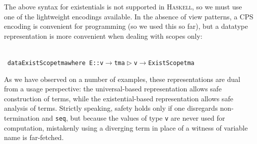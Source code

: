 \documentclass[9pt,authoryear]{sigplanconf}
\begin{document}
%
%


%
The above syntax for existentials is not supported in \textsc{Haskell},
    so we must use one of the lightweight encodings available. In
    the absence of view patterns, a CPS encoding is convenient for
    programming (so we used this so far), but a datatype representation
    is more convenient when dealing with scopes only{:}%


{\nopagebreak }

%
%
%
~\\~\vphantom{$\{$}\texttt{data}\texttt{\mbox{\hspace{0.50em}}}\texttt{ExistScope}\texttt{\mbox{\hspace{0.50em}}}\texttt{tm}\texttt{\mbox{\hspace{0.50em}}}\texttt{a}\texttt{\mbox{\hspace{0.50em}}}\texttt{where}\texttt{{\nopagebreak \newline%
}\vphantom{$\{$}}\texttt{\mbox{\hspace{0.50em}}}\texttt{\mbox{\hspace{0.50em}}}\texttt{E}\texttt{\mbox{\hspace{0.50em}}}\texttt{{:}{:}}\texttt{\mbox{\hspace{0.50em}}}\texttt{v}\texttt{\mbox{\hspace{0.50em}}}\texttt{$ \rightarrow $}\texttt{\mbox{\hspace{0.50em}}}\texttt{tm}\texttt{\mbox{\hspace{0.50em}}}\texttt{\makebox[1.22ex][l]{$ {(} $}}\texttt{a}\texttt{\mbox{\hspace{0.50em}}}\texttt{$ \vartriangleright $}\texttt{\mbox{\hspace{0.50em}}}\texttt{v}\texttt{\makebox[1.22ex][r]{$ {)} $}}\texttt{\mbox{\hspace{0.50em}}}\texttt{$ \rightarrow $}\texttt{\mbox{\hspace{0.50em}}}\texttt{ExistScope}\texttt{\mbox{\hspace{0.50em}}}\texttt{tm}\texttt{\mbox{\hspace{0.50em}}}\texttt{a}\texttt{{\nopagebreak \newline%
}\vphantom{$\{$}}%


%
As we have observed on a number of examples, these representations
    are dual from a usage perspective{:} the universal-based
    representation allows safe construction of terms, while the
    existential-based representation allows safe analysis of
    terms. Strictly speaking, safety holds only if one disregards
    non-termination and \texttt{seq}, but because the values of type \texttt{v}    are never used for computation, mistakenly using a diverging term in
    place of a witness of variable name is far-fetched.%
\end{document}
